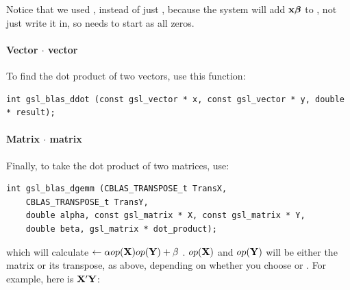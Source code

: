 Notice that we used , instead of just , because
the system will add ${\bf x}{\mbox{\boldmath$\beta$}}$ to , not just write it in,
so  needs to start as all zeros.

\paragraph{Vector $\cdot$ vector}\label{ddot}
To find the dot product of two vectors, use this function:
\begin{lstlisting}
int gsl_blas_ddot (const gsl_vector * x, const gsl_vector * y, double * result);
\end{lstlisting}




\paragraph{Matrix $\cdot$ matrix}
Finally, to take the dot product of two matrices, use:
\begin{lstlisting}
int gsl_blas_dgemm (CBLAS_TRANSPOSE_t TransX, 
    CBLAS_TRANSPOSE_t TransY, 
    double alpha, const gsl_matrix * X, const gsl_matrix * Y, 
    double beta, gsl_matrix * dot_product);
\end{lstlisting}
which will calculate  $\leftarrow \alpha op({\bf X}) op({\bf Y}) + \beta$ . $op({\bf X})$ and
$op({\bf Y})$ will be either the matrix or its transpose, as above, depending on whether you choose 
or . For example, here is ${\bf X}'{\bf Y}$:

